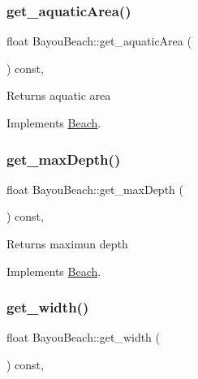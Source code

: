 \subsubsection{\texorpdfstring{get\+\_\+aquatic\+Area()}{get\_aquaticArea()}}
{\footnotesize\ttfamily float Bayou\+Beach\+::get\+\_\+aquatic\+Area (\begin{DoxyParamCaption}{ }\end{DoxyParamCaption}) const\hspace{0.3cm}{\ttfamily [inline]}, {\ttfamily [virtual]}}

\begin{DoxyReturn}{Returns}
aquatic area 
\end{DoxyReturn}


Implements \hyperlink{class_beach_afc6a57f98777ec5de1882acaf2703e6d}{Beach}.

\mbox{\label{class_bayou_beach_a9187c703f1cb4e36831ca5e116ba758a}} 
\subsubsection{\texorpdfstring{get\+\_\+max\+Depth()}{get\_maxDepth()}}
{\footnotesize\ttfamily float Bayou\+Beach\+::get\+\_\+max\+Depth (\begin{DoxyParamCaption}{ }\end{DoxyParamCaption}) const\hspace{0.3cm}{\ttfamily [inline]}, {\ttfamily [virtual]}}

\begin{DoxyReturn}{Returns}
maximun depth 
\end{DoxyReturn}


Implements \hyperlink{class_beach_a5942f7aa56af3b61d2974a754913ab7e}{Beach}.

\mbox{\label{class_bayou_beach_a4d4fe4911ac6772ac0335e133de498c8}} 
\subsubsection{\texorpdfstring{get\+\_\+width()}{get\_width()}}
{\footnotesize\ttfamily float Bayou\+Beach\+::get\+\_\+width (\begin{DoxyParamCaption}{ }\end{DoxyParamCaption}) const\hspace{0.3cm}{\ttfamily [inline]}, {\ttfamily [virtual]}}

